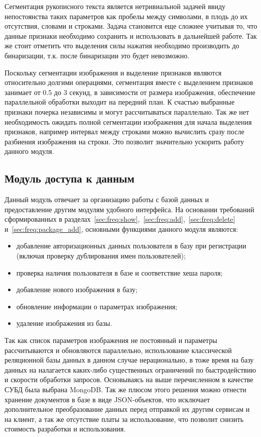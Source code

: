 Сегментация рукописного текста является нетривиальной задачей ввиду непостоянства таких параметров как пробелы между символами, в плодь до их отсутствия, словами и строками. Задача становится еще сложнее учитывая то, что данные признаки необходимо сохранить и использовать в дальнейшей работе. Так же стоит отметить что выделения силы нажатия необходимо производить до бинаризации, т.к. после бинаризации это будет невозможно.

Поскольку сегментации изображения и выделение признаков являются относительно долгими операциями, сегментация вместе с выделением признаков занимает от 0.5 до 3 секунд, в зависимости от размера изображения, обеспечение параллельной обработки выходит на передний план. К счастью выбранные признаки почерка независимы и могут рассчитываться параллельно. Так же нет необходимость ожидать полной сегментации изображения для начала выделения признаков, например интервал между строками можно вычислить сразу после разбиения изображения на строки. Это позволит значительно ускорить работу данного модуля.

\subsection{Модуль доступа к данным}
Данный модуль отвечает за организацию работы с базой данных и предоставление другим модулям удобного интерфейса.
На основании требований сформированных в разделах~\ref{sec:freq:show},~\ref{sec:freq:add},~\ref{sec:freq:delete} и~\ref{sec:freq:package_add}, основными функциями данного модуля являются:
\begin{itemize}
  \item добавление авторизационных данных пользователя в базу при регистрации (включая проверку дублирования имен пользователей);
  \item проверка наличия пользователя в базе и соответствие хеша пароля;
  \item добавление нового изображения в базу;
  \item обновление информации о параметрах изображения;
  \item удаление изображения из базы.
\end{itemize}

Так как список параметров изображения не постоянный и параметры рассчитываются и обновляются параллельно, использование классической реляционной базы данных в данном случае нерационально, в тоже время на базу данных на налагается каких-либо существенных ограничений по быстродействию и скорости обработки запросов. Основываясь на выше перечисленном в качестве СУБД была выбрана MongoDB.
Так же плюсом этого решения можно отнести хранение документов в базе в виде JSON-объектов, что исключает дополнительное преобразование данных перед отправкой их другим сервисам и на клиент, а так же отсутствие платы за использование, что позволит снизить стоимость разработки и использования.

